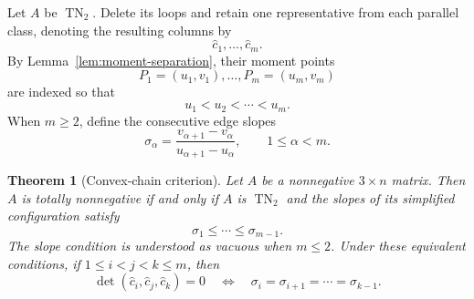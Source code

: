 \documentclass{amsart}
\numberwithin{equation}{section}
\newtheorem{theorem}{Theorem}
\theoremstyle{definition}
\theoremstyle{remark}
\DeclareMathOperator{\TN}{TN}
\begin{document}
Let $A$ be $\TN_2$.  Delete its loops and retain one representative from each parallel class, denoting the resulting columns by
\[
 \widehat c_1,\ldots,\widehat c_m.
\]
By Lemma~\ref{lem:moment-separation}, their moment points
\begin{equation}\label{eq:points}
 P_1=(u_1,v_1),\ldots,P_m=(u_m,v_m)
\end{equation}
are indexed so that
\begin{equation}\label{eq:ustrict}
 u_1<u_2<\cdots<u_m.
\end{equation}
When $m\ge2$, define the consecutive edge slopes
\begin{equation}\label{eq:sigma}
 \sigma_\alpha
 =\frac{v_{\alpha+1}-v_\alpha}{u_{\alpha+1}-u_\alpha},
 \qquad 1\le\alpha<m.
\end{equation}

\begin{theorem}[Convex-chain criterion]\label{thm:convex-chain}
Let $A$ be a nonnegative $3\times n$ matrix.  Then $A$ is totally nonnegative if and only if $A$ is $\TN_2$ and the slopes of its simplified configuration satisfy
\[
 \sigma_1\le\cdots\le\sigma_{m-1}.
\]
The slope condition is understood as vacuous when $m\le2$.  Under these equivalent conditions, if $1\le i<j<k\le m$, then
\begin{equation}\label{eq:zero-slope-run}
 \det(\widehat c_i,\widehat c_j,\widehat c_k)=0
 \quad\Longleftrightarrow\quad
 \sigma_i=\sigma_{i+1}=\cdots=\sigma_{k-1}.
\end{equation}
\end{theorem}
\end{document}
